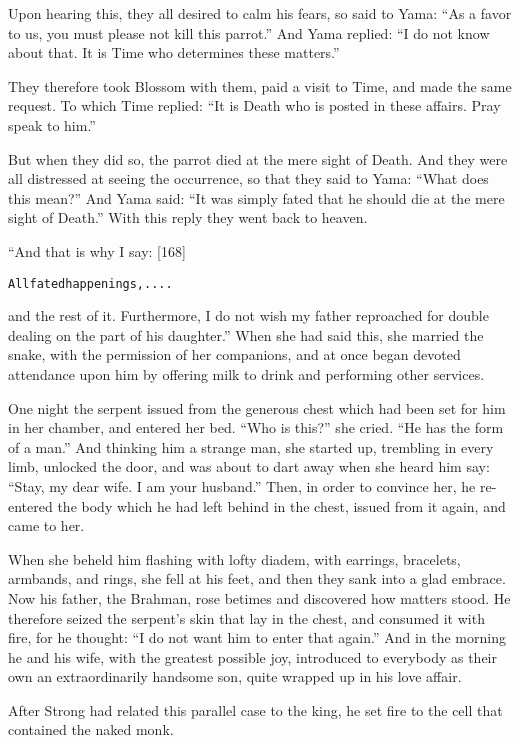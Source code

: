 \documentclass{article}
\renewenvironment{verbatim}{\begin{alltt}\normalfont\begin{centering}}{\end{centering}\end{alltt}}
\begin{document}
Upon hearing this, they all desired to calm his fears, so said to
Yama: ``As a favor to us, you must please not kill this parrot.''
And Yama replied:
``I do not know about that. It is Time who determines these matters.''

They therefore took Blossom with them, paid a visit to Time, and
made the same request. To which Time replied:
``It is Death who is posted in these affairs. Pray speak to him.''

But when they did so, the parrot died at the mere sight of Death.
And they were all distressed at seeing the occurrence, so that they
said to Yama: ``What does this mean?'' And Yama said:
``It was simply fated that he should die at the mere sight of Death.''
With this reply they went back to heaven.

“And that is why I say: [168]

\begin{verbatim}
All fated happenings, ....
\end{verbatim}
and the rest of it. Furthermore, I do not wish my father reproached
for double dealing on the part of his daughter.” When she had said
this, she married the snake, with the permission of her companions,
and at once began devoted attendance upon him by offering milk to
drink and performing other services.

One night the serpent issued from the generous chest which had been
set for him in her chamber, and entered her bed. ``Who is this?''
she cried. ``He has the form of a man.'' And thinking him a strange
man, she started up, trembling in every limb, unlocked the door,
and was about to dart away when she heard him say:
``Stay, my dear wife. I am your husband.'' Then, in order to
convince her, he re-entered the body which he had left behind in
the chest, issued from it again, and came to her.

When she beheld him flashing with lofty diadem, with earrings,
bracelets, armbands, and rings, she fell at his feet, and then they
sank into a glad embrace. Now his father, the Brahman, rose betimes
and discovered how matters stood. He therefore seized the serpent's
skin that lay in the chest, and consumed it with fire, for he
thought: ``I do not want him to enter that again.'' And in the
morning he and his wife, with the greatest possible joy, introduced
to everybody as their own an extraordinarily handsome son, quite
wrapped up in his love affair.

After Strong had related this parallel case to the king, he set
fire to the cell that contained the naked monk.
\end{document}
